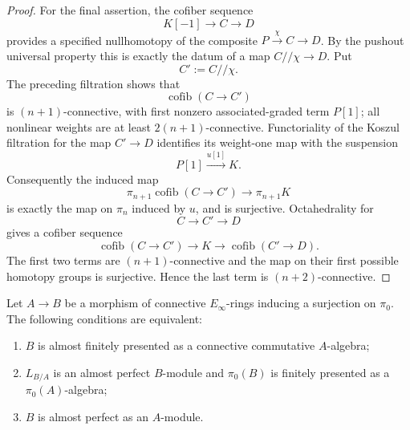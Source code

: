 \begin{proof}
For the final assertion, the cofiber sequence
\[
    K[-1]\longrightarrow C\longrightarrow D
\]
provides a specified nullhomotopy of the composite
$P\xrightarrow{\chi}C\to D$.  By the pushout universal property this is
exactly the datum of a map $C//\chi\to D$.  Put
\[
    C':=C//\chi.
\]
The preceding filtration shows that
\[
    \operatorname{cofib}(C\to C')
\]
is $(n+1)$-connective, with first nonzero associated-graded term $P[1]$;
all nonlinear weights are at least $2(n+1)$-connective.  Functoriality of the
Koszul filtration for the map $C'\to D$ identifies its weight-one map with
the suspension
\[
    P[1]\xrightarrow{u[1]}K.
\]
Consequently the induced map
\[
    \pi_{n+1}\operatorname{cofib}(C\to C')
    \longrightarrow
    \pi_{n+1}K
\]
is exactly the map on $\pi_n$ induced by $u$, and is surjective.  Octahedrality for
\[
    C\longrightarrow C'\longrightarrow D
\]
gives a cofiber sequence
\[
    \operatorname{cofib}(C\to C')
    \longrightarrow
    K
    \longrightarrow
    \operatorname{cofib}(C'\to D).
\]
The first two terms are $(n+1)$-connective and the map on their first possible
homotopy groups is surjective.  Hence the last term is $(n+2)$-connective.
\end{proof}

\begin{lemma}
\label{lem:bnla-spectral-cell-aft}
Let $A\to B$ be a morphism of connective $E_\infty$-rings inducing a
surjection on $\pi_0$.  The following conditions are equivalent:
\begin{enumerate}
    \item $B$ is almost finitely presented as a connective commutative
    $A$-algebra;
    \item $L_{B/A}$ is an almost perfect $B$-module and $\pi_0(B)$ is finitely
    presented as a $\pi_0(A)$-algebra;
    \item $B$ is almost perfect as an $A$-module.
\end{enumerate}
\end{lemma}

